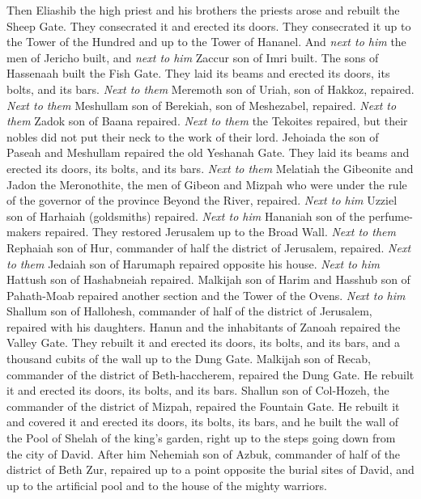 \begin{biblechapter} %
 Then Eliashib the high priest and his brothers the priests arose and rebuilt the Sheep Gate. They consecrated it and erected its doors. They consecrated it up to the Tower of the Hundred and up to the Tower of Hananel.
\verse And \textit{next to him} the men of Jericho built, and \textit{next to him} Zaccur son of Imri built.
\verse The sons of Hassenaah built the Fish Gate. They laid its beams and erected its doors, its bolts, and its bars.
\verse \textit{Next to them} Meremoth son of Uriah, son of Hakkoz, repaired. \textit{Next to them} Meshullam son of Berekiah, son of Meshezabel, repaired. \textit{Next to them} Zadok son of Baana repaired.
\verse \textit{Next to them} the Tekoites repaired, but their nobles did not put their neck to the work of their lord.
\verse Jehoiada the son of Paseah and Meshullam repaired the old Yeshanah Gate. They laid its beams and erected its doors, its bolts, and its bars.
\verse \textit{Next to them} Melatiah the Gibeonite and Jadon the Meronothite, the men of Gibeon and Mizpah who were under the rule of the governor of the province Beyond the River, repaired.
\verse \textit{Next to him} Uzziel son of Harhaiah (goldsmiths) repaired. \textit{Next to him} Hananiah son of the perfume-makers repaired. They restored Jerusalem up to the Broad Wall.
\verse \textit{Next to them} Rephaiah son of Hur, commander of half the district of Jerusalem, repaired.
\verse \textit{Next to them} Jedaiah son of Harumaph repaired opposite his house. \textit{Next to him} Hattush son of Hashabneiah repaired.
\verse Malkijah son of Harim and Hasshub son of Pahath-Moab repaired another section and the Tower of the Ovens.
\verse \textit{Next to him} Shallum son of Hallohesh, commander of half of the district of Jerusalem, repaired with his daughters.
\verse Hanun and the inhabitants of Zanoah repaired the Valley Gate. They rebuilt it and erected its doors, its bolts, and its bars, and a thousand cubits of the wall up to the Dung Gate.
\verse Malkijah son of Recab, commander of the district of Beth-haccherem, repaired the Dung Gate. He rebuilt it and erected its doors, its bolts, and its bars.
\verse Shallun son of Col-Hozeh, the commander of the district of Mizpah, repaired the Fountain Gate. He rebuilt it and covered it and erected its doors, its bolts, its bars, and he built the wall of the Pool of Shelah of the king’s garden, right up to the steps going down from the city of David.
\verse After him Nehemiah son of Azbuk, commander of half of the district of Beth Zur, repaired up to a point opposite the burial sites of David, and up to the artificial pool and to the house of the mighty warriors.

\end{biblechapter}
